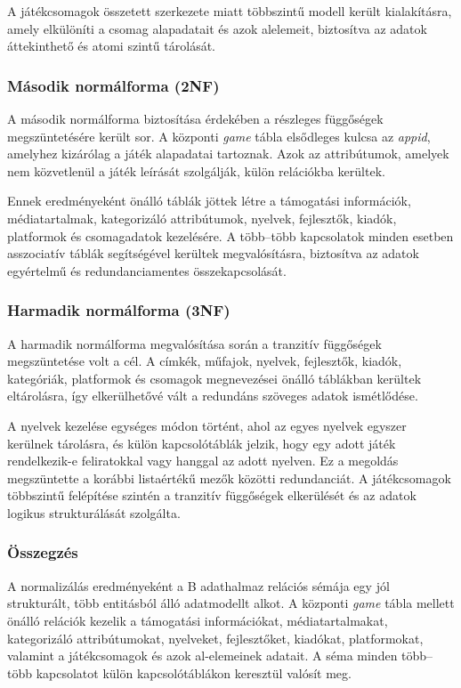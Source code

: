 A játékcsomagok összetett szerkezete miatt többszintű modell került kialakításra, amely elkülöníti a csomag alapadatait és azok alelemeit, biztosítva az adatok áttekinthető és atomi szintű tárolását.

\subsubsection{Második normálforma (2NF)}

A második normálforma biztosítása érdekében a részleges függőségek megszüntetésére került sor. A központi \textit{game} tábla elsődleges kulcsa az \textit{appid}, amelyhez kizárólag a játék alapadatai tartoznak. Azok az attribútumok, amelyek nem közvetlenül a játék leírását szolgálják, külön relációkba kerültek.

Ennek eredményeként önálló táblák jöttek létre a támogatási információk, médiatartalmak, kategorizáló attribútumok, nyelvek, fejlesztők, kiadók, platformok és csomagadatok kezelésére. A több–több kapcsolatok minden esetben asszociatív táblák segítségével kerültek megvalósításra, biztosítva az adatok egyértelmű és redundanciamentes összekapcsolását.

\subsubsection{Harmadik normálforma (3NF)}

A harmadik normálforma megvalósítása során a tranzitív függőségek megszüntetése volt a cél. A címkék, műfajok, nyelvek, fejlesztők, kiadók, kategóriák, platformok és csomagok megnevezései önálló táblákban kerültek eltárolásra, így elkerülhetővé vált a redundáns szöveges adatok ismétlődése.

A nyelvek kezelése egységes módon történt, ahol az egyes nyelvek egyszer kerülnek tárolásra, és külön kapcsolótáblák jelzik, hogy egy adott játék rendelkezik-e feliratokkal vagy hanggal az adott nyelven. Ez a megoldás megszüntette a korábbi listaértékű mezők közötti redundanciát. A játékcsomagok többszintű felépítése szintén a tranzitív függőségek elkerülését és az adatok logikus strukturálását szolgálta.

\subsubsection{Összegzés}

A normalizálás eredményeként a B \cite{b} adathalmaz relációs sémája egy jól strukturált, több entitásból álló adatmodellt alkot. A központi \textit{game} tábla mellett önálló relációk kezelik a támogatási információkat, médiatartalmakat, kategorizáló attribútumokat, nyelveket, fejlesztőket, kiadókat, platformokat, valamint a játékcsomagok és azok al-elemeinek adatait. A séma minden több–több kapcsolatot külön kapcsolótáblákon keresztül valósít meg.

